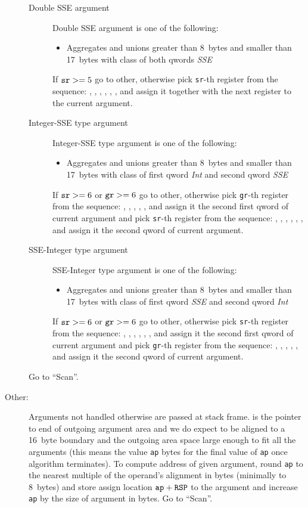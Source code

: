 \begin{description}
\begin{description}
\item[Double SSE argument]
Double SSE argument is one of the following:
\begin{itemize}
\item Aggregates and unions greater than 8~bytes and smaller than 17~bytes with class of both qwords \emph{SSE}
\end{itemize}
If $\verb|sr| >= 5$ go to other, otherwise pick \verb|sr|-th register from
the sequence: , , , , , , 
and assign it together with the
next register to the current argument.

\item[Integer-SSE type argument]
Integer-SSE type argument is one of the following:
\begin{itemize}
\item Aggregates and unions greater than 8~bytes and smaller than 17~bytes with class of first qword \emph{Int}
and second qword \emph{SSE}
\end{itemize}
If $\verb|sr| >= 6$ or $\verb|gr| >= 6$ go to other, otherwise pick \verb|gr|-th register from
the sequence: \RAX, \RDX, \RCX, \RBX, \RSI, \RDI 
and assign it the second first qword of current argument and pick \verb|sr|-th register from
the sequence: , , , , , , 
and assign it the second qword of current argument.

\item[SSE-Integer type argument]
SSE-Integer type argument is one of the following:
\begin{itemize}
\item Aggregates and unions greater than 8~bytes and smaller than 17~bytes with class of first qword \emph{SSE}
and second qword \emph{Int}
\end{itemize}
If $\verb|sr| >= 6$ or $\verb|gr| >= 6$ go to other, otherwise pick \verb|sr|-th register from
the sequence:
, , , , , , 
and assign it the second first qword of current argument and pick \verb|gr|-th register from
the sequence:
\RAX, \RDX, \RCX, \RBX, \RSI, \RDI 
and assign it the second qword of current argument.
\end{description}
Go to ``Scan''.

\item[Other:]

Arguments not handled otherwise are passed at stack frame. \RSP{} is the
pointer to end of outgoing argument area and we do expect \RSP{} to be
aligned to a 16~byte boundary and the outgoing area space large enough to fit all
the arguments (this means the value \verb|ap| bytes for the final value of
\verb|ap| once algorithm terminates).  To compute address of given argument,
round \verb|ap| to the nearest multiple of the operand's alignment in bytes
(minimally to 8~bytes) and
store assign location $\verb|ap|+\RSP$ to the argument and increase \verb|ap| by
the size of argument in bytes.
Go to ``Scan''.


\end{description}
